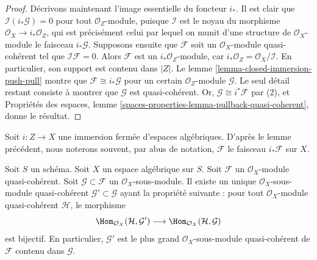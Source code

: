 \begin{proof}
\medskip\noindent
Décrivons maintenant l'image essentielle du
foncteur $i_*$. Il est clair que $\mathcal{I}(i_*\mathcal{G}) = 0$
pour tout $\mathcal{O}_Z$-module, puisque $\mathcal{I}$ est le noyau
du morphisme $\mathcal{O}_X \to i_*\mathcal{O}_Z$, qui est précisément celui
par lequel on munit d'une structure de $\mathcal{O}_X$-module le faisceau $i_*\mathcal{G}$.
Supposons ensuite que $\mathcal{F}$ soit un $\mathcal{O}_X$-module
quasi-cohérent tel que $\mathcal{I}\mathcal{F} = 0$.
Alors $\mathcal{F}$ est un $i_*\mathcal{O}_Z$-module,
car $i_*\mathcal{O}_Z = \mathcal{O}_X/\mathcal{I}$. En particulier,
son support est contenu dans $|Z|$. Le
lemme \ref{lemma-closed-immersion-push-pull}
montre que $\mathcal{F} \cong i_*\mathcal{G}$ pour un certain
$\mathcal{O}_Z$-module $\mathcal{G}$. Le seul détail restant consiste
à montrer que $\mathcal{G}$ est quasi-cohérent. Or,
$\mathcal{G} \cong i^*\mathcal{F}$ par (2), et
Propriétés des espaces,
lemme \ref{spaces-properties-lemma-pullback-quasi-coherent}, donne le résultat.
\end{proof}

\noindent
Soit $i : Z \to X$ une immersion fermée d'espaces algébriques.
D'après le lemme précédent, nous noterons souvent,
par abus de notation, $\mathcal{F}$ le faisceau $i_*\mathcal{F}$ sur $X$.

\begin{lemma}
\label{lemma-largest-quasi-coherent-subsheaf}
Soit $S$ un schéma. Soit $X$ un espace algébrique sur $S$.
Soit $\mathcal{F}$ un $\mathcal{O}_X$-module quasi-cohérent.
Soit $\mathcal{G} \subset \mathcal{F}$ un $\mathcal{O}_X$-sous-module.
Il existe un unique $\mathcal{O}_X$-sous-module quasi-cohérent
$\mathcal{G}' \subset \mathcal{G}$ ayant la propriété suivante :
pour tout $\mathcal{O}_X$-module quasi-cohérent $\mathcal{H}$, le morphisme
$$
\Hom_{\mathcal{O}_X}(\mathcal{H}, \mathcal{G}')
\longrightarrow
\Hom_{\mathcal{O}_X}(\mathcal{H}, \mathcal{G})
$$
est bijectif. En particulier, $\mathcal{G}'$ est le plus grand
$\mathcal{O}_X$-sous-module quasi-cohérent de $\mathcal{F}$ contenu dans $\mathcal{G}$.
\end{lemma}

